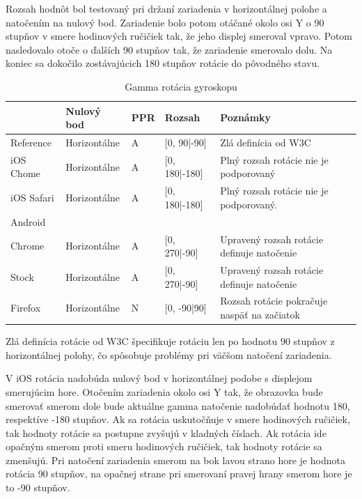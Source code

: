 Rozsah hodnôt bol testovaný pri držaní zariadenia v horizontálnej polohe a natočením na nulový bod. Zariadenie bolo potom otáčané okolo osi Y o 90 stupňov v smere hodinových ručičiek tak, že jeho displej smeroval vpravo. Potom nasledovalo otoče o ďalších 90 stupňov tak, že zariadenie smerovalo dolu. Na koniec sa dokočilo zostávajúcich 180 stupňov rotácie do pôvodného stavu.

\begin{table}[H]
  \begin{tabular}{ | l | l | l | l | l |}
  \hline
              & Nulový bod    & PPR   & Rozsah         & Poznámky\\ \hline
  Reference   & Horizontálne   & A     & [0, 90|-90]   & Zlá definícia od W3C \\  
  iOS Chome   & Horizontálne   & A     & [0, 180|-180] & Plný rozsah rotácie nie je podporovaný \\  
  iOS Safari  & Horizontálne   & A     & [0, 180|-180] & Plný rozsah rotácie nie je podporovaný. \\  
  Android & & & & \\  
  Chrome      & Horizontálne   & A     & [0, 270|-90]  & Upravený rozsah rotácie definuje natočenie \\  
  Stock       & Horizontálne   & A     & [0, 270|-90]  & Upravený rozsah rotácie definuje natočenie \\  
  Firefox     & Horizontálne   & N     & [0, -90|90]   & Rozsah rotácie pokračuje naspäť na začiatok \\
  \hline
  \end{tabular}
  \caption[Gamma rotácia gyroskopu]{Gamma rotácia gyroskopu}
\end{table}

Zlá definícia rotácie od W3C špecifikuje rotáciu len po hodnotu 90 stupňov z horizontálnej polohy, čo spôsobuje problémy pri väčšom natočení zariadenia.

V iOS rotácia nadobúda nulový bod v horizontálnej podobe s displejom smerujúcim hore. Otočením zariadenia okolo osi Y tak, že obrazovka bude smerovať smerom dole bude aktuálne gamma natočenie nadobúdať hodnotu 180, respektíve -180 stupňov. Ak sa rotácia uskutočňuje v smere hodinových ručičiek, tak hodnoty rotácie sa postupne zvyšujú v kladných číslach. Ak rotácia ide opačným smerom proti smeru hodinových ručičiek, tak hodnoty rotácie sa zmenšujú. Pri natočení zariadenia smerom na bok lavou strano hore je hodnota rotácia 90 stupňov, na opačnej strane pri smerovaní pravej hrany smerom hore je to -90 stupňov.

